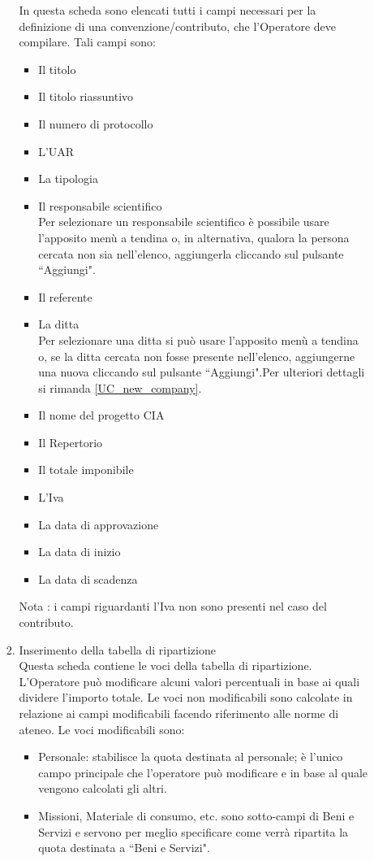 \begin{enumerate}
\begin{enumerate}
\begin{enumerate}
      In questa scheda sono elencati tutti i campi necessari per la definizione di una convenzione/contributo, 
      che l'Operatore deve compilare. Tali campi sono:
      \begin{itemize}
	\item Il titolo
	\item Il titolo riassuntivo
	\item Il numero di protocollo
	\item L'UAR
	\item La tipologia
	\item Il responsabile scientifico\\
	  Per selezionare un responsabile scientifico è possibile usare l'apposito menù a tendina o, in alternativa, qualora la persona cercata non sia nell'elenco, aggiungerla cliccando sul pulsante ``Aggiungi".
	\item Il referente
	\item La ditta\\
	  Per selezionare una ditta si può usare l'apposito menù a tendina o, se la ditta cercata non fosse presente nell'elenco, aggiungerne una nuova cliccando sul pulsante ``Aggiungi".Per ulteriori dettagli si rimanda \ref{UC_new_company}.
	\item Il nome del progetto CIA
	\item Il Repertorio
	\item Il totale imponibile
	\item L'Iva
	\item La data di approvazione
	\item La data di inizio
	\item La data di scadenza
      \end{itemize}
      
      Nota : i campi riguardanti l'Iva non sono presenti nel caso del contributo.
      
    \item Inserimento della tabella di ripartizione\\
     
      Questa scheda contiene le voci della tabella di ripartizione. L'Operatore può modificare alcuni valori percentuali 
      in base ai quali dividere l'importo totale. Le voci non modificabili sono calcolate in relazione ai campi modificabili facendo riferimento alle norme di ateneo. Le voci modificabili sono:
      \begin{itemize}
	\item Personale: stabilisce la quota destinata al personale; è l'unico campo principale che l'operatore può modificare e in base al quale vengono calcolati gli altri.
	\item Missioni, Materiale di consumo, etc. sono sotto-campi di Beni e Servizi e servono per meglio specificare come verrà ripartita la quota destinata a ``Beni e Servizi".
      \end{itemize}
      

\end{enumerate}
\end{enumerate}
\end{enumerate}
